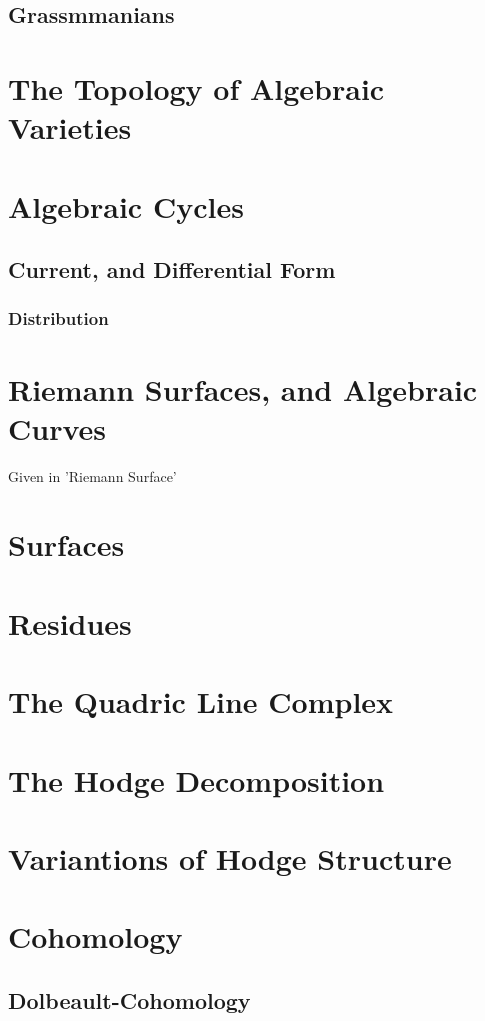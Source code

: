 \documentclass[Total.tex]{subfiles}
\begin{document}
		\section{Grassmmanians}
	\chapter{The Topology of Algebraic Varieties}
	\chapter{Algebraic Cycles}
		\section{Current, and Differential Form}
			\subsection{Distribution}
	\chapter{Riemann Surfaces, and Algebraic Curves}
		Given in 'Riemann Surface'
	\chapter{Surfaces}
	\chapter{Residues}
	\chapter{The Quadric Line Complex}
	\chapter{The Hodge Decomposition}
	\chapter{Variantions of Hodge Structure	}
	\chapter{Cohomology}
		\section{Dolbeault-Cohomology}
\end{document}
